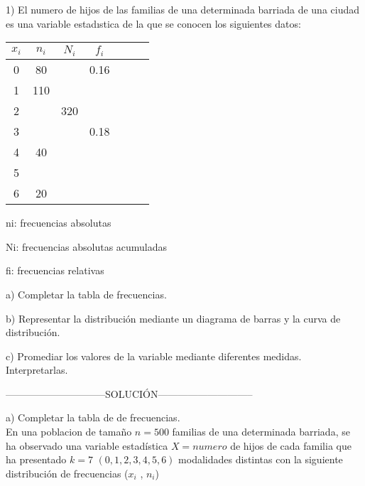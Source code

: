 \begin{table}[t]
	\begin{center}
		
			\begin{center}
				1)	El numero de hijos de las familias de una determinada barriada de una ciudad es una variable
		estadıstica de la que se conocen los siguientes datos:
		
			\end{center}
	
		\begin{tabular}{ | c | c | c | c | c | c | c | }
			
			
			\hline	
			$x_{i}$ & $n_{i}$ & $N_{i}$ & $f_{i}$ \\ \hline
			0 & 80 &  & 0.16 \\
			1 & 110 &  &  \\
			2 &  & 320 &  \\
			3 &  &  & 0.18 \\ 
			4 & 40 & &  \\
			5 & & & \\
			6 & 20 & & \\\hline
		\end{tabular}

\begin{flushright}
	\begin{center}
			ni: frecuencias absolutas
	
	Ni: frecuencias absolutas acumuladas
	
	fi: frecuencias relativas
	\end{center}
\end{flushright}

	\end{center}

a) Completar la tabla de frecuencias.

b) Representar la distribución mediante un diagrama de barras y la curva de distribución.

c) Promediar los valores de la variable mediante diferentes medidas. Interpretarlas.

\begin{center}
	------------------------------SOLUCIÓN-----------------------------
\end{center}

a) Completar la tabla de de  frecuencias.
\\

En una poblacion de tamaño $n = 500$ familias de una determinada barriada, se ha observado una variable estadística $ X = numero$  de hijos de cada familia que ha presentado $k = 7$ $(0,1,2,3,4,5,6)$ modalidades distintas con la siguiente distribución de frecuencias ($x_{i}$ , $n_{i}$)
	\begin{center}
		\begin{tabular}{ | c | c | c | c | c | c | c | }
	

\end{tabular}
\end{center}
\end{table}
